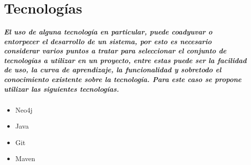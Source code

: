 \chapter{Tecnologías}
	\paragraph{El uso de alguna tecnología en particular, puede coadyuvar o entorpecer el desarrollo de un sistema, por esto es necesario considerar varios puntos a tratar para seleccionar el conjunto de tecnologías a utilizar en un proyecto, entre estas puede ser la facilidad de uso, la curva de aprendizaje, la funcionalidad y sobretodo el conocimiento existente sobre la tecnología. Para este caso se propone utilizar las siguientes tecnologías.}
	
	\begin{itemize}
	  \item Neo4j
	  \item Java
	  \item Git
	  \item Maven
	\end{itemize}